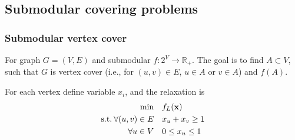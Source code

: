 \subsection{Submodular covering problems}
\subsubsection{Submodular vertex cover}
For graph $G=(V,E)$ and submodular $f: 2^V \to \mathbb{R}_+$. The goal is to find $A\subset V$, such that $G$ is vertex cover (i.e., for $ (u,v)\in E$, $u\in A$ or $v\in A$) and $f(A)$.

For each vertex define variable $x_i$, and the relaxation is 
\begin{align} \label{eq:scp_relax}
\min \quad&  f_L(\vb{x}) \\ 
\text{s.t.} \: \forall (u,v)\in E \quad&x_u+x_v \geq 1 \\
\forall u \in V \quad&0\leq x_u \leq 1 
\end{align}

